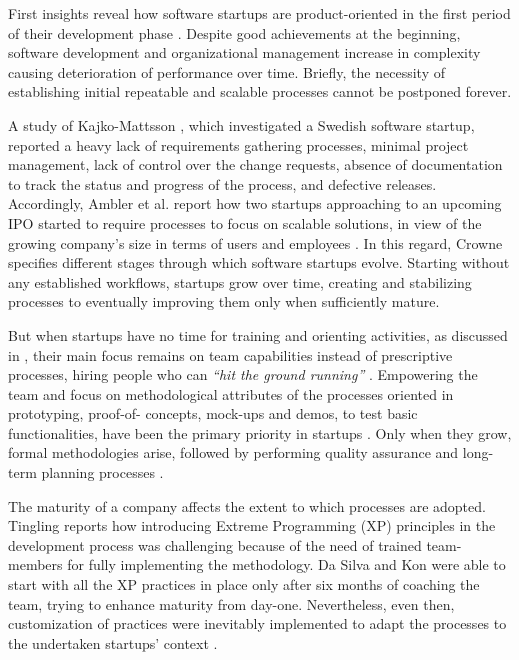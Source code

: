 \documentclass[10pt,journal,letterpaper,compsoc]{IEEEtran}
\begin{document}
First insights reveal how software startups are product-oriented in the first
period of their development phase \cite{Heitlager2007}. Despite good
achievements at the beginning, software development and organizational
management increase in complexity \cite{1456074,Banker1998} causing
deterioration of performance over time. Briefly, the necessity of establishing
initial repeatable and scalable processes cannot be postponed forever.

A study of Kajko-Mattsson \cite{Kajko-Mattsson2008}, which investigated a
Swedish software startup, reported a heavy lack of requirements gathering
processes, minimal project management, lack of control over the change requests,
absence of documentation to track the status and progress of the process, and
defective releases. Accordingly, Ambler et al. report how two startups
approaching to an upcoming IPO started to require processes to focus on scalable
solutions, in view of the growing company's size in terms of users and employees
\cite{Ambler2002}. In this regard, Crowne \cite{Crowne2002} specifies different
stages through which software startups evolve. Starting without any established
workflows, startups grow over time, creating and stabilizing processes to
eventually improving them only when sufficiently mature.

But when startups have no time for training and orienting activities, as
discussed in \cite{Sutton2000}, their main focus remains on team capabilities
instead of prescriptive processes, hiring people who can \textit{``hit the
ground running''} \cite{Yoffie1999}. Empowering the team and focus on
methodological attributes of the processes oriented in prototyping,  proof-of-
concepts, mock-ups and demos, to test basic functionalities, have been  the
primary priority in startups \cite{Camel1994a}. Only when they grow, formal
methodologies arise, followed by performing quality assurance and long-term
planning processes \cite{Yoffie1999}.

The maturity of a company affects the extent to which processes are adopted.
Tingling \cite{Tingling2007} reports how introducing Extreme Programming (XP)
principles \cite{Beck:2004:EPE:1076267} in the development process was
challenging because of the need of trained team-members for fully implementing
the methodology. Da Silva and Kon \cite{Silva2005} were able to start with all
the XP practices in place only after six months of coaching the team, trying to
enhance maturity from day-one. Nevertheless, even then, customization of
practices were inevitably implemented to adapt the processes to the undertaken
startups' context \cite{Deias}.
\end{document}
